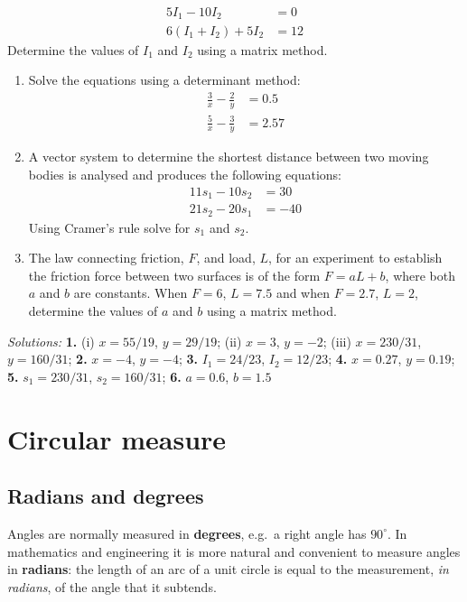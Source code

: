 \documentclass[
  12pt,
  oneside]{book}
\theoremstyle{definition}
\theoremstyle{definition}
\theoremstyle{definition}
\theoremstyle{definition}
\theoremstyle{remark}
\begin{document}
\begin{align*}
5I_1 - 10I_2 &=0\\
6(I_1+I_2)+5I_2 &=12
\end{align*}
Determine the values of \(I_1\) and \(I_2\) using a matrix method.

\begin{enumerate}
\def\labelenumi{\arabic{enumi}.}
\setcounter{enumi}{3}
\item
  Solve the equations using a determinant method:
  \begin{align*}
  \frac{3}{x}-\frac{2}{y} &= 0.5\\
  \frac{5}{x}-\frac{3}{y} &= 2.57
  \end{align*}
\item
  A vector system to determine the shortest distance between two moving bodies is analysed and produces the following equations:
  \begin{align*}
  11s_1 - 10s_2 &= 30\\
  21s_2 - 20s_1 &= -40
  \end{align*}
  Using Cramer's rule solve for \(s_1\) and \(s_2\).
\item
  The law connecting friction, \(F\), and load, \(L\), for an experiment to establish the friction force between two surfaces is of the form \(F = aL + b\), where both \(a\) and \(b\) are constants.
  When \(F = 6\), \(L = 7.5\) and when \(F = 2.7\), \(L = 2\), determine the values of \(a\) and \(b\) using a matrix method.
\end{enumerate}

\emph{Solutions:}
\textbf{1.} (i) \(x=55/19\), \(y=29/19\);
(ii) \(x=3\), \(y=-2\);
(iii) \(x=230/31\), \(y=160/31\);
\textbf{2.} \(x=-4\), \(y=-4\);
\textbf{3.} \(I_1=24/23\), \(I_2=12/23\);
\textbf{4.} \(x=0.27\), \(y=0.19\);
\textbf{5.} \(s_1=230/31\), \(s_2=160/31\);
\textbf{6.} \(a=0.6\), \(b=1.5\)

\hypertarget{circular-measure}{%
\chapter{Circular measure}\label{circular-measure}}

\hypertarget{radians-and-degrees}{%
\section{Radians and degrees}\label{radians-and-degrees}}

Angles are normally measured in \textbf{degrees}, e.g.~a right angle has \(90^\circ\). In mathematics and engineering it is more natural and convenient to measure angles in \textbf{radians}: the length of an arc of a unit circle is equal to the measurement, \emph{in radians}, of the angle that it subtends.
\end{document}
